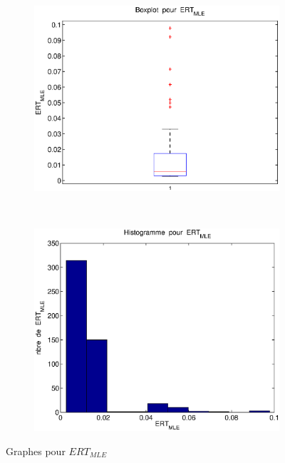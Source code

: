 \begin{figure}[!ht]
        \centering
        \begin{subfigure}[b]{0.5\textwidth}
                \includegraphics[width=\textwidth]{graphes/boxplot_ertmle.eps}
        \end{subfigure}%
        ~ 
        \begin{subfigure}[b]{0.5\textwidth}
                \includegraphics[width=\textwidth]{graphes/hist_ertmle.eps}
        \end{subfigure}
        \caption{Graphes pour $ERT_{MLE}$}\label{fig:ertmle}
\end{figure}


